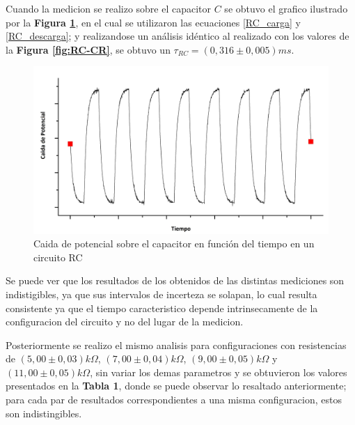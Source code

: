\documentclass[11pt,a4paper]{article}
\begin{document}
Cuando la medicion se realizo sobre el capacitor $C$ se obtuvo el grafico ilustrado por la \textbf{Figura \ref{fig:RC-CC}}, en el cual se utilizaron las ecuaciones \eqref{RC_carga} y \eqref{RC_descarga}; y realizandose un análisis idéntico al realizado con los valores de la \textbf{Figura \ref{fig:RC-CR}}, se obtuvo un $\tau_{RC}=(0,316 \pm 0,005) ms$.

\begin{figure}[H]
\centering
\includegraphics[scale=0.45]{RC-Caida_en_Capacitor}
  \caption{Caida de potencial sobre el capacitor en función del tiempo en un circuito RC}
  \label{fig:RC-CC}
\end{figure}

Se puede ver que los resultados de los obtenidos de las distintas mediciones son indistigibles, ya que sus intervalos de incerteza se solapan, lo cual resulta consistente ya que el tiempo caracteristico depende intrinsecamente de la configuracion del circuito y no del lugar de la medicion.

Posteriormente se realizo el mismo analisis para configuraciones con resistencias de $(5,00\pm0,03)k\Omega$, $(7,00\pm0,04)k\Omega$, $(9,00\pm0,05)k\Omega$ y $(11,00\pm0,05)k\Omega$, sin variar los demas parametros y se obtuvieron los valores presentados en la \textbf{Tabla 1}, donde se puede observar lo resaltado anteriormente; para cada par de resultados correspondientes a una misma configuracion, estos son indistingibles.\\ 
\end{document}
